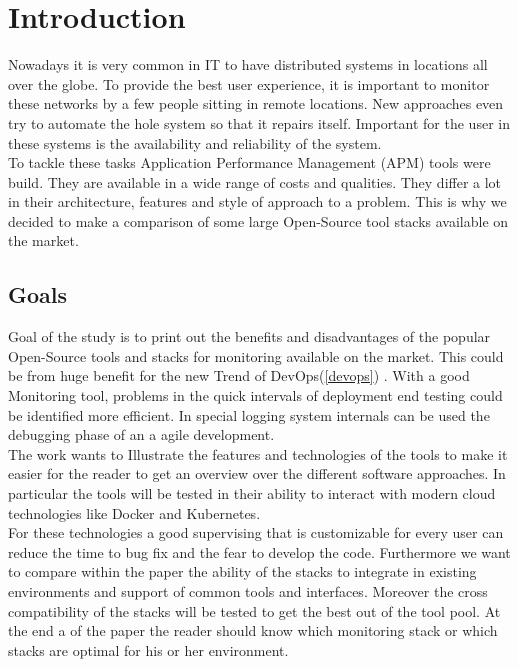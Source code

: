 
\chapter{Introduction}
Nowadays it is very common in IT to have distributed systems in locations all over the globe. To provide the best user experience, it is important to monitor these networks by a few people sitting in remote locations. New approaches even try to automate the hole system so that it repairs itself. Important for the user in these systems is the availability and reliability of the system. 
\\
To tackle these tasks Application Performance Management (APM) tools were build. They are available in a wide range of costs and qualities. They differ a lot in their architecture, features and style of approach to a problem. This is why we decided to make a comparison of some large Open-Source tool stacks available on the market. 
\section{Goals}
Goal of the study is to print out the benefits and disadvantages of the popular Open-Source tools and stacks for monitoring available on the market. This could be from huge benefit for the new Trend of DevOps(\cref{devops}) \cite{Bass:2015:DSA:2810087} . With a good Monitoring tool, problems in the quick intervals of deployment end testing could be identified more efficient. In special logging system internals can be used the debugging phase of an a agile development.  
\\ The work wants to Illustrate the features and technologies of the tools to make it easier for the reader to get an overview over the different software approaches. In particular the tools will be tested in their ability to interact with modern cloud technologies like Docker and Kubernetes.\\
For these technologies a good supervising that is customizable for every user can reduce the time to bug fix and the fear to develop the code.
 Furthermore we want to compare within the paper the ability of the stacks to integrate in existing environments and support of common tools and interfaces. Moreover the cross compatibility of the stacks will be tested to get the best out of the tool pool. At the end a of the paper the reader should know which monitoring stack or which stacks are optimal for his or her environment.  

